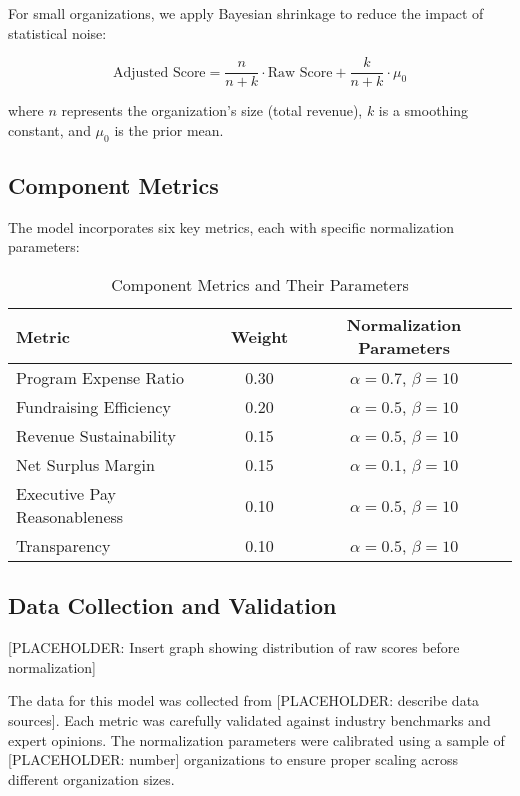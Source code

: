 For small organizations, we apply Bayesian shrinkage to reduce the impact of statistical noise:

\begin{equation}
    \text{Adjusted Score} = \frac{n}{n + k} \cdot \text{Raw Score} + \frac{k}{n + k} \cdot \mu_0
\end{equation}

where $n$ represents the organization's size (total revenue), $k$ is a smoothing constant, and $\mu_0$ is the prior mean.

\subsection{Component Metrics}

The model incorporates six key metrics, each with specific normalization parameters:

\begin{table}[h]
\centering
\begin{tabular}{|l|c|c|}
\hline
\textbf{Metric} & \textbf{Weight} & \textbf{Normalization Parameters} \\
\hline
Program Expense Ratio & 0.30 & $\alpha = 0.7$, $\beta = 10$ \\
Fundraising Efficiency & 0.20 & $\alpha = 0.5$, $\beta = 10$ \\
Revenue Sustainability & 0.15 & $\alpha = 0.5$, $\beta = 10$ \\
Net Surplus Margin & 0.15 & $\alpha = 0.1$, $\beta = 10$ \\
Executive Pay Reasonableness & 0.10 & $\alpha = 0.5$, $\beta = 10$ \\
Transparency & 0.10 & $\alpha = 0.5$, $\beta = 10$ \\
\hline
\end{tabular}
\caption{Component Metrics and Their Parameters}
\label{tab:metrics}
\end{table}

\subsection{Data Collection and Validation}

[PLACEHOLDER: Insert graph showing distribution of raw scores before normalization]

The data for this model was collected from [PLACEHOLDER: describe data sources]. Each metric was carefully validated against industry benchmarks and expert opinions. The normalization parameters were calibrated using a sample of [PLACEHOLDER: number] organizations to ensure proper scaling across different organization sizes.

